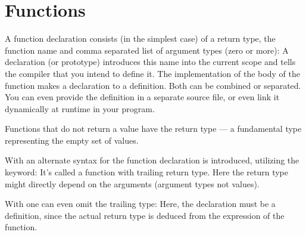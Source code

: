 \section{Functions\label{sec:function}}
A function declaration consists (in the simplest case) of a return type, the function name and comma separated list of argument types (zero or more):
%
%
A declaration (or prototype) introduces this name into the current scope and tells the compiler that you intend to define it. The
implementation of the body of the function makes a declaration to a definition. Both can be combined or separated. You can even provide
the definition in a separate source file, or even link it dynamically at runtime in your program.

Functions that do not return a value have the return type  --- a fundamental type representing the empty set of values.

\begin{rem}
  With \marginpar{[\cxx{11}]} an alternate syntax for the function declaration is introduced, utilizing the  keyword:
  It's called a function with trailing return type. Here the return type might directly depend on the arguments (argument types not values).

  With \marginpar{[\cxx{14}]} one can even omit the trailing type:
  Here, the declaration must be a definition, since the actual return type is deduced from the  expression of the function.
\end{rem}

